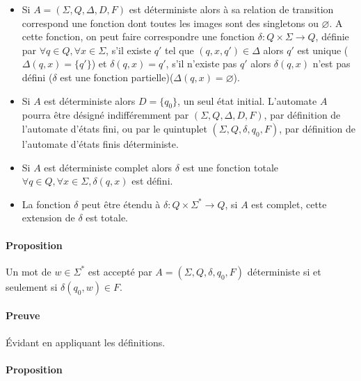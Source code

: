 \begin{itemize}
	\item Si $A=(\Sigma,Q,\Delta,D,F)$ est déterministe alors à sa relation de transition correspond une fonction dont toutes les images sont des singletons ou $\varnothing$. A cette fonction, on peut faire correspondre une fonction $\delta : Q \times \Sigma \rightarrow Q$, définie par $\forall q \in Q, \forall x \in \Sigma$, s'il existe $q'$ tel que $(q,x,q') \in \Delta$ alors $q'$ est unique ($\Delta(q,x) = \{q'\}$) et $\delta(q,x)=q'$, s'il n'existe pas $q'$ alors $\delta(q,x)$ n'est pas défini ($\delta$ est une fonction partielle)($\Delta(q,x)=\varnothing$).

	\item Si $A$ est déterministe alors $D=\{q_0\}$, un seul état initial. L'automate $A$ pourra être désigné indifféremment par $(\Sigma,Q,\Delta,D,F)$, par définition de l'automate d'états fini, ou par le quintuplet $(\Sigma,Q,\delta,q_0,F)$, par définition de l'automate d'états finis déterministe.

	\item Si $A$ est déterministe complet alors $\delta$ est une fonction totale\\
	$\forall q \in Q, \forall x \in \Sigma, \delta(q,x)$ est défini.

	\item La fonction $\delta$ peut être étendu à $\delta : Q \times \Sigma^* \rightarrow Q$, si $A$ est complet, cette extension de $\delta$ est totale.
\end{itemize}



\paragraph{Proposition} %
\label{par:proposition}

Un mot de $w \in \Sigma^*$ est accepté par $A=(\Sigma,Q,\delta,q_0,F)$ déterministe si et seulement si $\delta(q_0,w) \in F$.



\paragraph{Preuve} %
\label{par:preuve}

Évidant en appliquant les définitions.



\paragraph{Proposition} %
\label{par:proposition}

